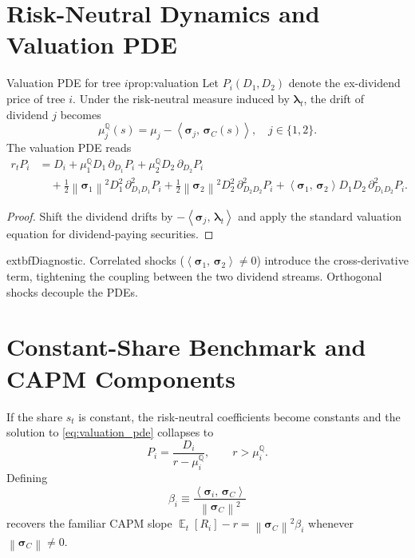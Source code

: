 ﻿\documentclass[11pt,letterpaper,oneside]{article}
\numberwithin{equation}{section}
\DeclareMathOperator{\E}{\mathbb{E}}
\newcommand{\1}{\mathbf{1}}
\newcommand{\norm}[1]{\left\lVert #1\right\rVert}
\newcommand{\ip}[2]{\left\langle #1,\,#2\right\rangle}
\begin{document}
\section{Risk-Neutral Dynamics and Valuation PDE}\label{sec:pde}
\begin{proposition}{Valuation PDE for tree $i$}{prop:valuation}
Let $P_i(D_1,D_2)$ denote the ex-dividend price of tree $i$. Under the risk-neutral measure induced by $\bm{\lambda}_t$, the drift of dividend $j$ becomes
\begin{equation}\label{eq:rn_drift}
  \mu_j^{\mathbb{Q}}(s) = \mu_j-\ip{\bm{\sigma}_j}{\bm{\sigma}_C(s)}, \quad j\in\{1,2\}.
\end{equation}
The valuation PDE reads
\begin{align}\label{eq:valuation_pde}
  r_t P_i &= D_i
   + \mu_1^{\mathbb{Q}} D_1\,\partial_{D_1} P_i
   + \mu_2^{\mathbb{Q}} D_2\,\partial_{D_2} P_i \\
  &\quad + \tfrac12 \norm{\bm{\sigma}_1}^2 D_1^2\,\partial^2_{D_1 D_1} P_i
   + \tfrac12 \norm{\bm{\sigma}_2}^2 D_2^2\,\partial^2_{D_2 D_2} P_i
   + \ip{\bm{\sigma}_1}{\bm{\sigma}_2} D_1 D_2\,\partial^2_{D_1 D_2} P_i.
\end{align}
\end{proposition}
\begin{proof}
Shift the dividend drifts by $-\ip{\bm{\sigma}_j}{\bm{\lambda}_t}$ and apply the standard valuation equation for dividend-paying securities.
\end{proof}

\begin{tcolorbox}[mathstyle]
  	extbf{Diagnostic.} Correlated shocks ($\ip{\bm{\sigma}_1}{\bm{\sigma}_2}\neq0$) introduce the cross-derivative term, tightening the coupling between the two dividend streams. Orthogonal shocks decouple the PDEs.
\end{tcolorbox}

\section{Constant-Share Benchmark and CAPM Components}\label{sec:benchmark}
If the share $s_t$ is constant, the risk-neutral coefficients become constants and the solution to \eqref{eq:valuation_pde} collapses to
\begin{equation}\label{eq:const_share_solution}
  P_i = \frac{D_i}{r-\mu_i^{\mathbb{Q}}}, \qquad r>\mu_i^{\mathbb{Q}}.
\end{equation}
Defining
\begin{equation}\label{eq:beta}
  \beta_i \equiv \frac{\ip{\bm{\sigma}_i}{\bm{\sigma}_C}}{\norm{\bm{\sigma}_C}^2}
\end{equation}
recovers the familiar CAPM slope $\E_t[R_i]-r=\norm{\bm{\sigma}_C}^2\beta_i$ whenever $\norm{\bm{\sigma}_C}\neq0$.
\end{document}
